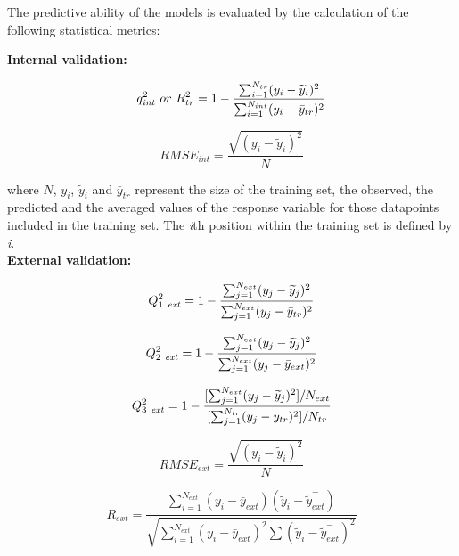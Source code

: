 \documentclass[twoside,a4wide,12pt]{article}\usepackage[]{graphicx}\usepackage[]{color}
\begin{document}
The predictive ability of the models is evaluated by the calculation of the following statistical metrics:

{\bf Internal validation:}

\begin{equation}
q_{{\it int}}^{2} \ or \  R_{tr}^{2}  = 1 - \frac {\sum_{i=1}^{N_{tr}} (y_{i} - \widetilde{y}_{i})^{2}} {\sum_{i=1}^{N_{int}} (y_{i} - \bar{y}_{tr})^{2}}
\end{equation}

\begin{equation}
RMSE_{int} = \frac {\sqrt {(y_i - \widetilde{y}_i)^{2}}} {N}
\end{equation}

where $N$, $y_i$, $\widetilde{y}_i$ and $\bar{y}_{tr}$ represent the size of the training set, the observed, the predicted and the averaged values of the response variable for those datapoints included in the training set. The {\it i}th position within the training set is defined by {\it i}.\\  


{\bf External validation:}


\begin{equation}
Q_{1\ {\it ext}}^{2} = 1 - \frac {\sum_{j=1}^{N_{ext}} (y_j-\widetilde{y}_j)^{2}}  {\sum_{j=1}^{N_{ext}} (y_j - \bar{y}_{tr})^{2}}
\end{equation}

\begin{equation}
Q_{2\ {\it ext}}^{2} = 1 - \frac {\sum_{j=1}^{N_{ext}} (y_j-\widetilde{y}_j)^{2}}  {\sum_{j=1}^{N_{ext}} (y_j - \bar{y}_{ext})^{2}}
\end{equation}

\begin{equation}
Q_{3\ {\it ext}}^{2} = 1 - \frac {[\sum_{j=1}^{N_{ext}} (y_j-\widetilde{y}_j)^{2}] / N_{ext} }  {[ \sum_{j=1}^{N_{tr}} (y_j - \bar{y}_{tr})^{2}] / N_{tr}}
\end{equation}

\begin{equation}
RMSE_{ext} = \frac {\sqrt {(y_i - \widetilde{y}_i)^{2}}} {N} 
\end{equation}

\begin{equation}
R_{ext} = \frac {{\sum_{i=1}^{N_{ext}} (y_{i} - \bar{y}_{ext})}  (\widetilde{y}_{i} - \overset{-}{\widetilde{y}_{ext}})} 
{\sqrt{\sum_{i=1}^{N_{ext}} (y_{i} - \bar{y}_{ext})^{2} \sum{ (\widetilde{y}_{i} - \overset{-}{\widetilde{y}_{ext}})^{2}}}}
\end{equation}
\end{document}
